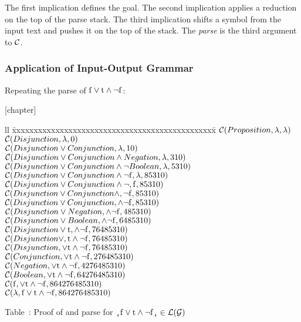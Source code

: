 \noindent The first implication defines the goal.  
The second implication applies a reduction on the top of the parse stack.  
The third implication shifts a symbol 
from the input text and pushes it on the top of the stack.  
The {\em parse} is the third argument to $\mbox{$\cal C$}$.

\subsubsection{Application of Input-Output Grammar}

Repeating the parse of ${\rm f}\vee{\rm t}\wedge\neg{\rm f}$:

{}[chapter]
\setcounter{IOGProof}{\value{table}}
\begin{tabbing}{ll}
\quad\quad\quad\quad\=
xxxxxxxxxxxxxxxxxxxxxxxxxxxxxxxxxxxxxxxxxxxxxxx\=\kill
\>$\mbox{$\cal C$}(Proposition,\lambda, \lambda)$                               \\
\>$\mbox{$\cal C$}(Disjunction,\lambda, 0)$                                     \\
\>$\mbox{$\cal C$}(Disjunction\vee Conjunction, \lambda, 10)$                   \\
\>$\mbox{$\cal C$}(Disjunction\vee Conjunction \wedge Negation, \lambda, 310)$  \\
\>$\mbox{$\cal C$}(Disjunction\vee Conjunction\wedge\neg Boolean, \lambda, 5310)$\\
\>$\mbox{$\cal C$}(Disjunction\vee Conjunction\wedge\neg\rm f, \lambda, 85310)$ \\
\>$\mbox{$\cal C$}(Disjunction\vee Conjunction\wedge\neg,\rm f, 85310)$         \\
\>$\mbox{$\cal C$}(Disjunction\vee Conjunction\wedge,\neg\rm f, 85310)$         \\
\>$\mbox{$\cal C$}(Disjunction\vee Conjunction,\wedge\neg\rm f, 85310)$         \\
\>$\mbox{$\cal C$}(Disjunction\vee Negation,\wedge\neg\rm f, 485310)$           \\
\>$\mbox{$\cal C$}(Disjunction\vee Boolean,\wedge\neg\rm f, 6485310)$           \\
\>$\mbox{$\cal C$}(Disjunction\vee\rm t,\wedge\neg f, 76485310)$                \\
\>$\mbox{$\cal C$}(Disjunction\vee,\rm t\wedge\neg f, 76485310)$                \\
\>$\mbox{$\cal C$}(Disjunction,\vee\rm t\wedge\neg f, 76485310)$                \\
\>$\mbox{$\cal C$}(Conjunction,\vee\rm t\wedge\neg f, 276485310)$               \\
\>$\mbox{$\cal C$}(Negation,\vee\rm t\wedge\neg f, 4276485310)$                 \\
\>$\mbox{$\cal C$}(Boolean,\vee\rm t\wedge\neg f, 64276485310)$                 \\
\>$\mbox{$\cal C$}(\rm f,\vee t\wedge\neg f, 864276485310)$                     \\
\>$\mbox{$\cal C$}(\rm\lambda,f\vee t \wedge\neg f, 864276485310)$
\end{tabbing}
\begin{center}
Table~\thetable: 
Proof of and parse for
$\sq{\rm f}\vee{\rm t}\wedge\neg{\rm f}\sq \in \cal L(G)$
\end{center}


